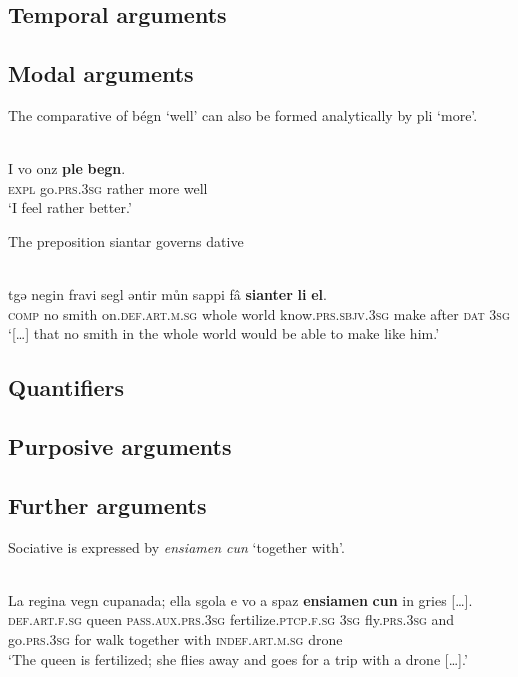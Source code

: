 \subsection{Temporal arguments}


\subsection{Modal arguments}

The comparative of bégn `well' can also be formed analytically by pli `more'.

\ea\label{}
\\
\gll  I vo onz \textbf{ple} \textbf{begn}. \\
     \textsc{expl} go.\textsc{prs.3sg} rather more well\\
\glt `I feel rather better.'
\z


The preposition siantar governs dative

\ea\label{}
\\
\gll   […] tgǝ negin fravi segl ǝntir můn sappi fâ \textbf{sianter} \textbf{li} \textbf{el}. \\
     […]  \textsc{comp} no smith on.\textsc{def.art.m.sg} whole world know.\textsc{prs.sbjv.3sg} make after \textsc{dat} \textsc{3sg}\\
\glt `[…] that no smith in the whole world would be able to make like him.'
\z


\subsection{Quantifiers}

\subsection{Purposive arguments}

\subsection{Further arguments}

Sociative is expressed by \textit{ensiamen cun} `together with'.

\ea\label{}
\\
\gll   La regina vegn cupanada; ella sgola e vo a spaz \textbf{ensiamen} \textbf{cun} in gries […]. \\
    \textsc{def.art.f.sg} queen  \textsc{pass.aux.prs.3sg} fertilize.\textsc{ptcp.f.sg} \textsc{3sg} fly.\textsc{prs.3sg} and go.\textsc{prs.3sg} for walk together with \textsc{indef.art.m.sg} drone \\
\glt `The queen is fertilized; she flies away and goes for a trip with a drone […].'
\z


